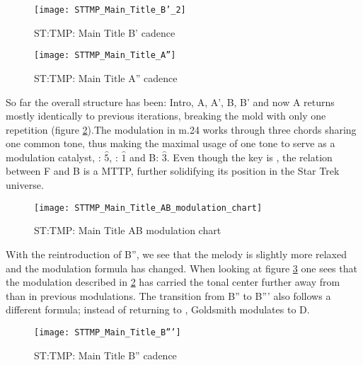 \begin{figure}[h!]
\center
\texttt{[image: STTMP\_Main\_Title\_B'\_2]}
	\caption{ST:TMP: Main Title B' cadence}
	\label{fg:sttmp_main_title_b_cadence}
\end{figure}



\begin{figure}[h!]
\center
\texttt{[image: STTMP\_Main\_Title\_A'']}
	\caption{ST:TMP: Main Title A'' cadence}
	\label{fg:sttmp_main_title_a''_cadence}
\end{figure}

So far the overall structure has been: Intro, A, A', B, B' and now A returns mostly identically to previous iterations, breaking the mold with only one repetition (figure \ref{fg:sttmp_main_title_a''_cadence}).The modulation in m.24 works through three chords sharing one common tone, thus making the maximal usage of one tone to serve as a modulation catalyst, \giss: \(\hat{5}\), \diss: \(\hat{1}\) and B: \(\hat{3}\). Even though the key is \bflat, the relation between F and B is a \ac{MTTP}, further solidifying its position in the Star Trek universe. 

\begin{figure}[h!]
\center
\texttt{[image: STTMP\_Main\_Title\_AB\_modulation\_chart]}
	\caption{ST:TMP: Main Title AB modulation chart}
	\label{STTMP_Main_Title_AB_modulation_chart}
\end{figure}

With the reintroduction of B'', we see that the melody is slightly more relaxed and the modulation formula has changed. When looking at figure \ref{STTMP_Main_Title_AB_modulation_chart} one sees that the modulation described in \ref{fg:sttmp_main_title_a''_cadence} has carried the tonal center further away from \bflat than in previous modulations. The transition from B'' to B''' also follows a different formula; instead of returning to \bflat, Goldsmith modulates to D. 

\begin{figure}[h!]
\center
\texttt{[image: STTMP\_Main\_Title\_B''']}
	\caption{ST:TMP: Main Title B'' cadence}
	\label{fg:sttmp_main_title_b''_cadence}
\end{figure}

